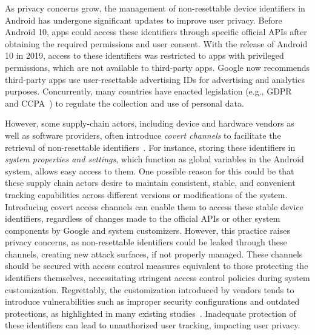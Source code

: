 As privacy concerns grow, the management of non-resettable device identifiers in Android has undergone significant updates to improve user privacy.
Before Android 10, apps could access these identifiers through specific official APIs after obtaining the required permissions and user consent.
With the release of Android 10 in 2019, access to these identifiers was restricted to apps with privileged permissions, which are not available to third-party apps.
Google now recommends third-party apps use user-resettable advertising IDs for advertising and analytics purposes.
Concurrently, many countries have enacted legislation (e.g., GDPR~\cite{gdpr} and CCPA~\cite{ccpa}) to regulate the collection and use of personal data.

However, some supply-chain actors, including device and hardware vendors as well as software providers, often introduce \textit{covert channels} to facilitate the retrieval of non-resettable identifiers~\cite{meng2023post, zhou2022uncovering}.
For instance, storing these identifiers in \textit{system properties and settings}, which function as global variables in the Android system, allows easy access to them.
One possible reason for this could be that these supply chain actors desire to maintain consistent, stable, and convenient tracking capabilities across different versions or modifications of the system. 
Introducing covert access channels can enable them to access these stable device identifiers, regardless of changes made to the official APIs or other system components by Google and system customizers.
However, this practice raises privacy concerns, as non-resettable identifiers could be leaked through these channels, creating new attack surfaces, if not properly managed.
These channels should be secured with access control measures equivalent to those protecting the identifiers themselves, necessitating stringent access control policies during system customization.
Regrettably, the customization introduced by vendors tends to introduce vulnerabilities such as improper security configurations and outdated protections, as highlighted in many existing studies~\cite{possemato2021trust, hou2022large, elsabagh2020firmscope, liu2022customized, el2021dissecting, li2021android}.
Inadequate protection of these identifiers can lead to unauthorized user tracking, impacting user privacy.

